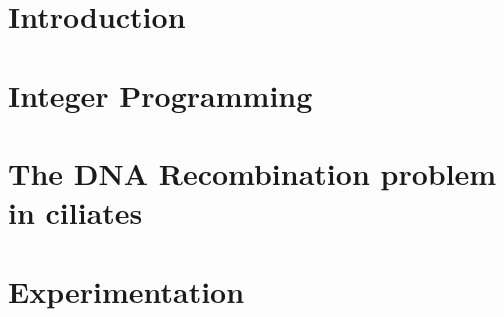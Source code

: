\documentclass[12pt,a4paper]{report}
\begin{document}



\tableofcontents
\thispagestyle{empty}

\chapter{Introduction}


\chapter{Integer Programming}


\chapter{The DNA Recombination problem in ciliates}


\chapter{Experimentation}




\end{document}
